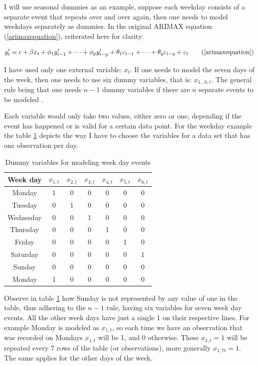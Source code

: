 \documentclass[12pt,a4paper,titlepage]{report}
\begin{document}
I will use seasonal dummies as an example, suppose each weekday consists of a separate event that repeats over and over again, then one needs to model weekdays separately as dummies. In the original ARIMAX equation (\ref{arimaxequation}), reiterated here for clarity:

\[
y'_{t} = c + \beta x_{t} + \phi_{1}y'_{t-1} + \cdots + \phi_{p}y'_{t-p} + \theta_{1}\varepsilon_{t-1} + \cdots + \theta_{q}\varepsilon_{t-q} + \varepsilon_{t} 
\tag{\ref{arimaxequation}}
\]

I have used only one external variable: $ x_{t} $. If one needs to model the seven days of the week, then one needs to use six dummy variables, that is: $ x_{1\dots6,t} $. The general rule being that one needs $ n - 1 $ dummy variables if there are $ n $ separate events to be modeled \cite{fpp2usefulpredictors}.

Each variable would only take two values, either zero or one, depending if the event has happened or is valid for a certain data point. For the weekday example the table \ref{weekdaydummies} depicts the way I have to choose the variables for a data set that has one observation per day.

\begin{table}[h]
    \begin{tabular}{|c|c|c|c|c|c|c|}
        \hline 
        \textbf{Week day} & \textbf{$x_{1,t}$} & \textbf{$x_{2,t}$} & \textbf{$x_{3,t}$} & \textbf{$x_{4,t}$} & \textbf{$x_{5,t}$} & \textbf{$x_{6,t}$} \\ \hline 
        Monday & 1 & 0 & 0 & 0 & 0 & 0 \\ \hline 
        Tuesday & 0 & 1 & 0 & 0 & 0 & 0 \\ \hline 
        Wednesday &	0 & 0 & 1 & 0 & 0 & 0 \\ \hline 
        Thursday & 0 & 0 & 0 & 1 & 0 & 0 \\ \hline 
        Friday & 0 & 0 & 0 & 0 & 1 & 0 \\ \hline 
        Saturday & 0 & 0 & 0 & 0 & 0 & 1 \\ \hline 
        Sunday & 0 & 0 & 0 & 0 & 0 & 0 \\ \hline 
        Monday & 1 & 0 & 0 & 0 & 0 & 0 \\ \hline 
    \end{tabular} 
    \centering
    \caption{Dummy variables for modeling week day events}
    \label{weekdaydummies}
\end{table}

Observe in table \ref{weekdaydummies} how Sunday is not represented by any value of one in the table, thus adhering to the $ n - 1 $ rule, having six variables for seven week day events. All the other week days have just a single 1 on their respective lines. For example Monday is modeled as $ x_{1,t} $, so each time we have an observation that was recorded on Mondays $ x_{1,t} $ will be 1, and 0 otherwise. These $ x_{1,t} = 1 $ will be repeated every 7 rows of the table (or observations), more generally $ x_{1,7t} = 1 $. The same applies for the other days of the week.
\end{document}
